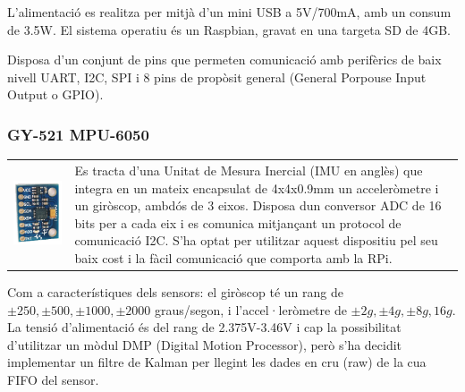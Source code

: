 \documentclass[twoside]{article}
\begin{document}
L'alimentació es realitza per mitjà d'un mini USB a 5V/700mA, amb un consum de 3.5W. El sistema operatiu és un Raspbian, gravat en una targeta SD de 4GB. 

Disposa d'un conjunt de pins que permeten comunicació amb perifèrics de baix nivell UART, I2C, SPI i 8 pins de propòsit general (General Porpouse Input Output o GPIO).

\subsubsection*{GY-521 MPU-6050}
\begin{table}[!h]
\begin{tabular}{m{1.5cm}m{12cm}}
\hspace{1cm}\includegraphics[scale=0.1]{images/mpu-6050.jpg} & Es tracta d'una Unitat de Mesura Inercial (IMU en anglès) que integra en un mateix encapsulat de 4x4x0.9mm un acceleròmetre i un giròscop, ambdós de 3 eixos. Disposa dun conversor ADC de 16 bits per a cada eix i es comunica mitjançant un protocol de comunicació I2C. S'ha optat per utilitzar aquest dispositiu pel seu baix cost i la fàcil comunicació que comporta amb la RPi.\\
\end{tabular}
\end{table}
Com a característiques dels sensors: el giròscop té un rang de  $\pm250,\pm500,\pm1000,\pm2000$ graus/segon, i l'accel·leròmetre de $\pm2g,\pm4g,\pm8g,16g$. La tensió d'alimentació és del rang de 2.375V-3.46V i cap la possibilitat d'utilitzar un mòdul DMP (Digital Motion Processor), però s'ha decidit implementar un filtre de Kalman per llegint les dades en cru (raw) de la cua FIFO del sensor.
\end{document}
